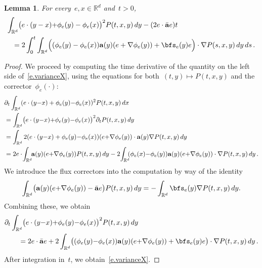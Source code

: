 \documentclass[11pt,twoside]{article} %
\numberwithin{equation}{section}
\newtheorem{lemma}[theorem]{Lemma}
\theoremstyle{definition}
\newcommand*{\Rd}{\ensuremath{\mathbb{R}^d}}
\renewcommand{\a}{\mathbf{a}}
\newcommand{\ahom}{\bar{\a}}
\begin{document}
\begin{lemma}
\label{l.varianceX}
For every~$e, x \in\Rd$ and~$t >0$, 
\begin{align}
\label{e.varianceX}
\lefteqn{
\int_{\Rd} 
\bigl(e \cdot (y-x) {+}\phi_{e}(y) - \phi_e(x) \bigr)^2 P(t,x,y)\,dy 
-
(2 e\cdot \ahom e) t
} 
\ \ 
& 
\notag \\ &
=
2 \int_0^{t}   
\int_{\Rd}   
\Bigl( ( \phi_e(y) - \phi_e(x) )
\a(y)(e+\nabla \phi_{e}(y)) 
+ 
\bfs_e (y) e\Bigr)\cdot
\nabla P(s ,x,y)\,dy 
\,ds\,.
\end{align}
\end{lemma}
\begin{proof}
We proceed by computing the time derivative of the quantity on the left side of~\eqref{e.varianceX}, using the equations for both~$(t,y) \mapsto P(t,x,y)$ and the corrector~$\phi_e(\cdot)$:
\begin{align*}
\lefteqn{
\partial_t \int_{\Rd} 
(e \cdot (y{-}x)+\phi_{e}(y) {-} \phi_e(x))^2 
P(t,x,y)\,dx
}  & 
\\ &
=
\int_{\Rd} 
\bigl(e \cdot (y{-}x) {+}\phi_{e}(y) {-} \phi_e(x) \bigr)^2 
\partial_t P(t,x,y)\,dy
\\ & 
=
\int_{\Rd} 
2 (e \cdot (y{-}x)+\phi_{e}(y) {-} \phi_e(x) )
(e {+} \nabla \phi_e(y)) 
\cdot
\a(y)
\nabla P(t,x,y)\,dy
\\ & 
=
2e \cdot \!
\int_{\Rd} \!\!
\a (y)(e {+} \nabla \phi_e(y)) P(t,x,y)\,dy
-
2 \!\int_{\Rd} \!\!
(\phi_e(x) {-} \phi_e(y))
\a(y) (e {+} \nabla \phi_{e}(y)) 
\cdot 
\nabla P(t,x,y) \,dy\,.
\end{align*}
We introduce the flux correctors into the computation by way of the identity
\begin{align*}
\int_{\Rd} 
\bigl( 
\a (y) (e {+} \nabla \phi_{e}(y)) -\ahom e \bigr)
P(t,x,y)\,dy
=
-\int_{\Rd} 
\bfs_{e} (y) \nabla P(t,x,y)\,dy.
\end{align*}
Combining these, we obtain
\begin{align*}
\lefteqn{
\partial_t \int_{\Rd} 
\bigl(e \cdot (y{-} x) {+} \phi_{e}(y) {-} \phi_e(x) \bigr)^2 
P(t,x,y)\,dy
} \qquad & 
\\ & 
=
2e\cdot \ahom e 
+
2 \int_{\Rd} 
\bigl( ( \phi_e(y) {-} \phi_e(x) )
\a (y)(e {+} \nabla \phi_{e}(y)) 
+\bfs_e (y) e\bigr)
\cdot
\nabla P(t,x,y)\,dy
\,.
\end{align*}
After integration in~$t$, we obtain~\eqref{e.varianceX}.
\end{proof} 
\end{document}
